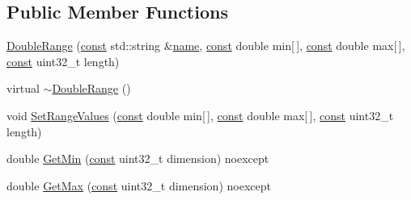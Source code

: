 \subsection*{Public Member Functions}
\begin{DoxyCompactItemize}
\item 
\mbox{\hyperlink{classlucene_1_1core_1_1document_1_1DoubleRange_ac6c5423e8f054367ecd48401865f5ab5}{Double\+Range}} (\mbox{\hyperlink{ZlibCrc32_8h_a2c212835823e3c54a8ab6d95c652660e}{const}} std\+::string \&\mbox{\hyperlink{classlucene_1_1core_1_1document_1_1Field_a52f673f3b3abb14b180f5159f4726537}{name}}, \mbox{\hyperlink{ZlibCrc32_8h_a2c212835823e3c54a8ab6d95c652660e}{const}} double min\mbox{[}$\,$\mbox{]}, \mbox{\hyperlink{ZlibCrc32_8h_a2c212835823e3c54a8ab6d95c652660e}{const}} double max\mbox{[}$\,$\mbox{]}, \mbox{\hyperlink{ZlibCrc32_8h_a2c212835823e3c54a8ab6d95c652660e}{const}} uint32\+\_\+t length)
\item 
virtual \mbox{\hyperlink{classlucene_1_1core_1_1document_1_1DoubleRange_a45fd069e037e7bc951603fe5376b1554}{$\sim$\+Double\+Range}} ()
\item 
void \mbox{\hyperlink{classlucene_1_1core_1_1document_1_1DoubleRange_a86f4a1467c114de406f39fd311675055}{Set\+Range\+Values}} (\mbox{\hyperlink{ZlibCrc32_8h_a2c212835823e3c54a8ab6d95c652660e}{const}} double min\mbox{[}$\,$\mbox{]}, \mbox{\hyperlink{ZlibCrc32_8h_a2c212835823e3c54a8ab6d95c652660e}{const}} double max\mbox{[}$\,$\mbox{]}, \mbox{\hyperlink{ZlibCrc32_8h_a2c212835823e3c54a8ab6d95c652660e}{const}} uint32\+\_\+t length)
\item 
double \mbox{\hyperlink{classlucene_1_1core_1_1document_1_1DoubleRange_a3ca5167af09ebd334f78362c2eac2c0f}{Get\+Min}} (\mbox{\hyperlink{ZlibCrc32_8h_a2c212835823e3c54a8ab6d95c652660e}{const}} uint32\+\_\+t dimension) noexcept
\item 
double \mbox{\hyperlink{classlucene_1_1core_1_1document_1_1DoubleRange_a5a68667b9d3d2687100e9b96bd729084}{Get\+Max}} (\mbox{\hyperlink{ZlibCrc32_8h_a2c212835823e3c54a8ab6d95c652660e}{const}} uint32\+\_\+t dimension) noexcept
\end{DoxyCompactItemize}
